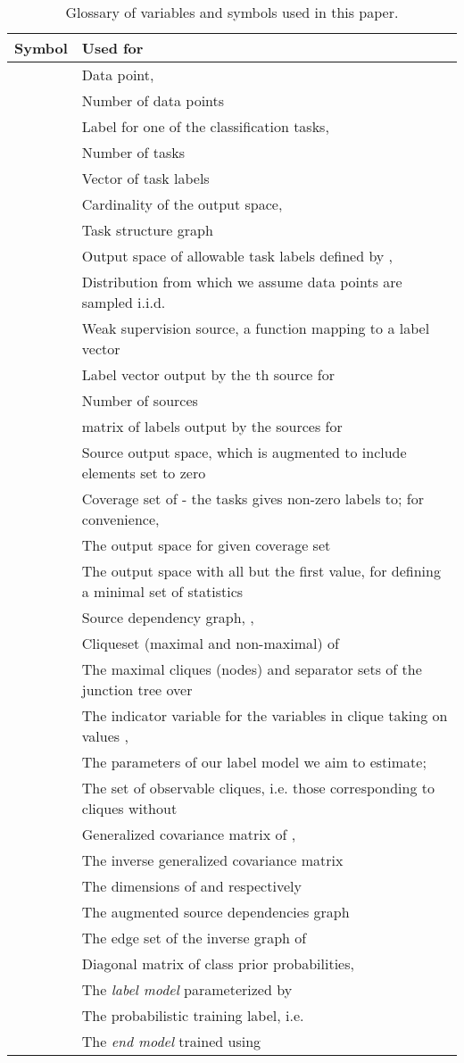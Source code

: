 \documentclass[letterpaper]{article}
\begin{document}
\begin{appendix}
\begin{table*}[h]
\centering
\begin{tabular}{l l}
\toprule
Symbol & Used for \\
\midrule
 & Data point,  \\
 & Number of data points \\
 & Label for one of the  classification tasks,  \\
 & Number of tasks \\
 & Vector of task labels  \\
 & Cardinality of the output space,  \\
 & Task structure graph \\
 & Output space of allowable task labels defined by ,  \\
 & Distribution from which we assume  data points are sampled i.i.d. \\
 & Weak supervision source, a function mapping  to a label vector\\
 & Label vector  output by the th source for  \\
 & Number of sources \\
 &  matrix of labels output by the  sources for  \\
 & Source output space, which is  augmented to include elements set to zero \\
 & Coverage set of - the tasks  gives non-zero labels to; for convenience,  \\
 & The output space for  given coverage set  \\
 & The output space  with all but the first value, for defining a minimal set of statistics \\
 & Source dependency graph, ,  \\
 & Cliqueset (maximal and non-maximal) of  \\
 & The maximal cliques (nodes) and separator sets of the junction tree over  \\
 & The indicator variable for the variables in clique  taking on values ,  \\
 & The parameters of our label model we aim to estimate;  \\
 & The set of observable cliques, i.e. those corresponding to cliques without  \\
 & Generalized covariance matrix of ,  \\
 & The inverse generalized covariance matrix  \\
 & The dimensions of  and  respectively \\
 & The augmented source dependencies graph  \\
 & The edge set of the inverse graph of  \\
 & Diagonal matrix of class prior probabilities,  \\
 & The \textit{label model} parameterized by  \\
 & The probabilistic training label, i.e.  \\
 & The \textit{end model} trained using  \\
\end{tabular}
\caption{
	Glossary of variables and symbols used in this paper.
}
\label{table:glossary}
\end{table*}


\end{appendix}
\end{document}
